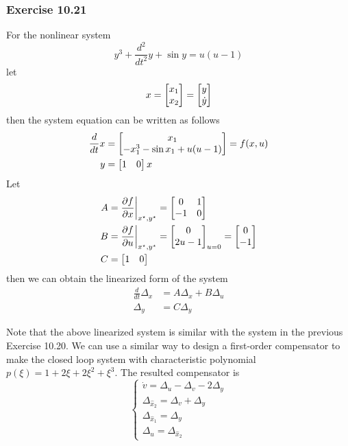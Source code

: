 \subsubsection{Exercise 10.21}
For the nonlinear system 
\begin{equation}
    y^3 + \frac{d^2}{dt^2}y + \sin y = u(u-1)
\end{equation}
let
\begin{equation}
    x = \begin{bmatrix} x_1 \\ x_2 \end{bmatrix} = \begin{bmatrix} y \\ \dot y \end{bmatrix}
\end{equation}
then the system equation can be written as follows
\begin{align}
    \frac{d}{dt}x &= \begin{bmatrix} x_1 \\ -x_1^3-\sin{x_1}+u(u-1) \end{bmatrix} = f(x,u) \\
    y &= \begin{bmatrix} 1 &0 \end{bmatrix} x
\end{align}
Let
\begin{align}
    A &= \frac{\partial f}{\partial x}\bigg|_{x^\star,y^\star} = \begin{bmatrix} 0 &1 \\ -1 &0 \end{bmatrix} \\
    B &= \frac{\partial f}{\partial u}\bigg|_{x^\star,y^\star} = \begin{bmatrix} 0 \\ 2u-1 \end{bmatrix}_{u=0} = \begin{bmatrix} 0 \\ -1 \end{bmatrix} \\
    C &= \begin{bmatrix} 1 &0 \end{bmatrix}
\end{align}
then we can obtain the linearized form of the system
\begin{align}
    \frac{d}{dt}\Delta_x &= A\Delta_x + B\Delta_u \\
    \Delta_y &= C \Delta_y
\end{align}

Note that the above linearized system is similar with the system in the previous Exercise 10.20. We can use a similar way to design a first-order compensator to make the closed loop system with characteristic polynomial $p(\xi) = 1 + 2\xi + 2\xi^2 + \xi^3$. The resulted compensator is
\begin{equation}
    \begin{cases}
        \dot v = \Delta_u - \Delta_v -2\Delta_y \\
        \Delta_{\hat{x}_2} = \Delta_v + \Delta_y \\
        \Delta_{\hat{x}_1} = \Delta_y \\
        \Delta_u = \Delta_{\hat{x}_2}
    \end{cases}
\end{equation}
